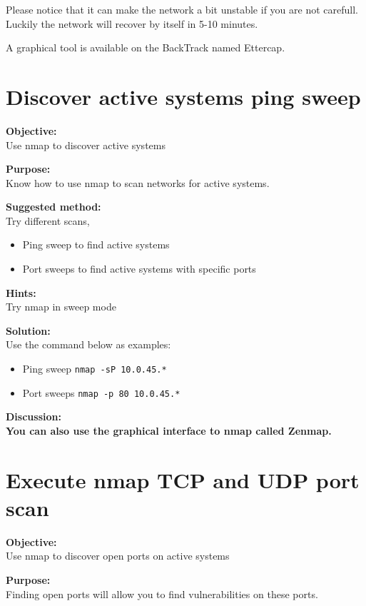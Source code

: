 \documentclass[a4paper,11pt,notitlepage]{report}
\begin{document}
Please notice that it can make the network a bit unstable if you are not carefull. Luckily the network will recover by itself in 5-10 minutes.

A graphical tool is available on the BackTrack named Ettercap.


\chapter{Discover active systems ping sweep}
\label{ex:nmap-pingsweep}

{\bf Objective:}\\
Use nmap to discover active systems

{\bf Purpose:}\\
Know how to use nmap to scan networks for active systems.

{\bf Suggested method:}\\
Try different scans,
\begin{itemize}
\item Ping sweep to find active systems
\item Port sweeps to find active systems with specific ports
\end{itemize}

{\bf Hints:} \\
Try nmap in sweep mode

{\bf Solution:}\\
Use the command below as examples:
\begin{itemize}
\item Ping sweep \verb+nmap -sP 10.0.45.*+
\item Port sweeps \verb+nmap -p 80 10.0.45.*+
\end{itemize}

{\bf Discussion:}\\

{\bf You can also use the graphical interface to nmap called Zenmap.}


\chapter{Execute nmap TCP and UDP port scan}
\label{ex:nmap-synscan}


{\bf Objective:} \\
Use nmap to discover open ports on active systems

{\bf Purpose:}\\
Finding open ports will allow you to find vulnerabilities on these ports.
\end{document}
